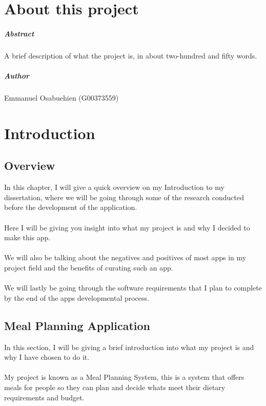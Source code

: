 
\chapter*{About this project}
\paragraph{Abstract}
A brief description of what the project is, in about two-hundred and fifty words.

\paragraph{Author}
Emmanuel Osabuehien (G00373559)

\chapter{Introduction}

\section{Overview}

In this chapter, I will give a quick overview on my Introduction to my dissertation, where we will be going through some of the research conducted before the development of the application.\\ \\
Here I will be giving you insight into what my project is and why I decided to make this app.\\ \\
We will also be talking about the negatives and positives of most apps in my project field and the benefits of curating such an app.\\ \\
We will lastly be going through the software requirements that I plan to complete by the end of the apps developmental process.

\section {Meal Planning Application}

In this section, I will be giving a brief introduction into what my project is and why I have chosen to do it.\\ \\
My project is known as a Meal Planning System, this is a system that offers meals for people so they can plan and decide whats meet their dietary requirements and budget.

